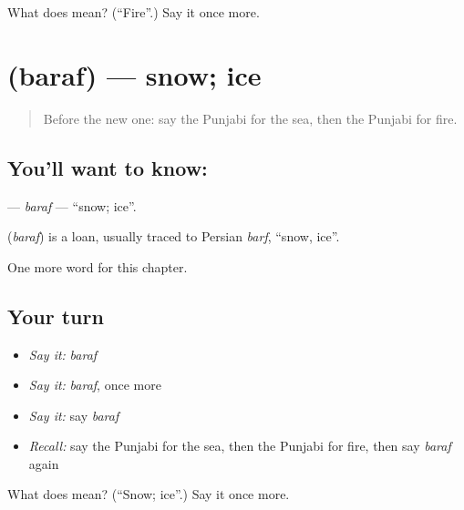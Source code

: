 \begin{tcolorbox}[breakable,colback=teal!4,colframe=teal!35!black,title={Before you move on}]
What does  mean? (\textquotedblleft{}Fire\textquotedblright{}.) Say it once more.
\end{tcolorbox}
\section[\texorpdfstring{\pa{ਬਰਫ਼} (baraf)}{ਬਰਫ਼ (baraf)}]{ (baraf) — snow; ice}

\label{lesson:PA-C76-baraf}



\begin{quote}
Before the new one: say the Punjabi for the sea, then the Punjabi for fire.
\end{quote}

\subsection*{You'll want to know: }
\textbf{} — \emph{baraf} — \textquotedblleft{}snow; ice\textquotedblright{}.

\begin{cousinweb}
\textbf{} (\emph{baraf}) is a loan, usually traced to Persian \emph{barf}, \textquotedblleft{}snow, ice\textquotedblright{}.
\end{cousinweb}

\begin{grammarlens}[title={What you've built}]
One more word for this chapter.
\end{grammarlens}

\subsection*{Your turn}
\begin{itemize}
\raggedright
  \item \emph{Say it:} \emph{baraf}
  \item \emph{Say it:} \emph{baraf}, once more
  \item \emph{Say it:} say \emph{baraf}
  \item \emph{Recall:} say the Punjabi for the sea, then the Punjabi for fire, then say \emph{baraf} again
\end{itemize}

\begin{tcolorbox}[breakable,colback=teal!4,colframe=teal!35!black,title={Before you move on}]
What does  mean? (\textquotedblleft{}Snow; ice\textquotedblright{}.) Say it once more.
\end{tcolorbox}

